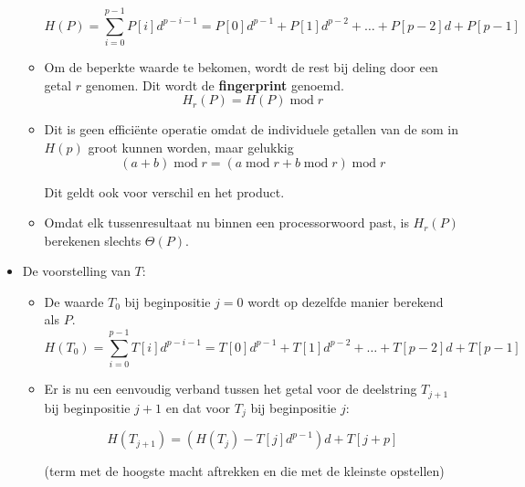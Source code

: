 \begin{itemize}
\begin{itemize}
        $$H(P) = \sum_{i=0}^{p-1} P[i]d^{p-i-1} = P[0]d^{p-1} + P[1]d^{p-2} + \dots + P[p-2]d + P[p-1]$$

        \item Om de beperkte waarde te bekomen, wordt de rest bij deling door een getal $r$ genomen. Dit wordt de \textbf{fingerprint} genoemd.
        $$H_r(P) = H(P)\;\mathrm{mod}\;r$$
    
        \item Dit is geen efficiënte operatie omdat de individuele getallen van de som in $H(p)$ groot kunnen worden, maar gelukkig
        $$(a + b) \;\mathrm{mod}\;r = (a\;\mathrm{mod}\;r + b\;\mathrm{mod}\;r)\;\mathrm{mod}\;r$$
    
        Dit geldt ook voor verschil en het product.
    
        \item Omdat elk tussenresultaat nu binnen een processorwoord past, is $H_r(P)$ berekenen slechts $\Theta(P)$.
    \end{itemize}
    \item De voorstelling van $T$:
    \begin{itemize}
        \item De waarde $T_0$ bij beginpositie $j = 0$ wordt op dezelfde manier berekend als $P$.
        $$H(T_0) = \sum_{i=0}^{p-1} T[i]d^{p-i-1} = T[0]d^{p-1} + T[1]d^{p-2} + \dots + T[p-2]d + T[p-1]$$

        \item Er is nu een eenvoudig verband tussen het getal voor de deelstring $T_{j + 1}$ bij beginpositie $j + 1$ en dat voor $T_{j}$ bij beginpositie $j$:

        $$H(T_{j + 1}) = (H(T_j) - T[j]d^{p-1})d + T[j + p]$$

        (term met de hoogste macht aftrekken en die met de kleinste opstellen)


\end{itemize}
\end{itemize}
